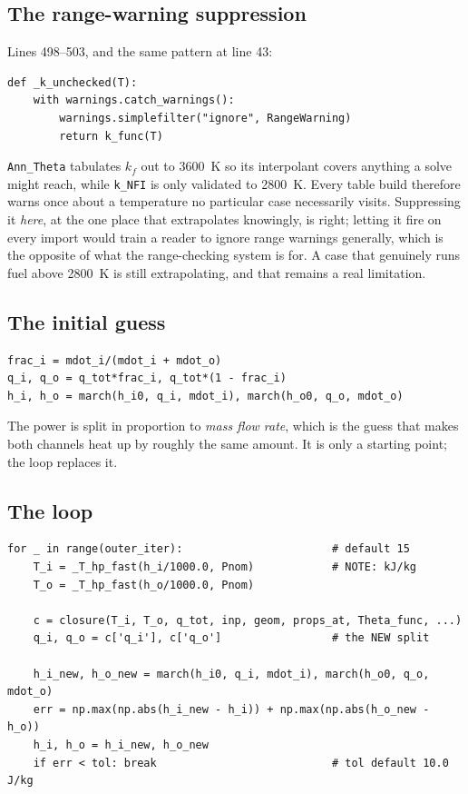 \documentclass[11pt]{article}
\newcommand{\code}[1]{\texttt{#1}}
\begin{document}
\subsection{The range-warning suppression}
Lines 498--503, and the same pattern at line 43:
\begin{lstlisting}
def _k_unchecked(T):
    with warnings.catch_warnings():
        warnings.simplefilter("ignore", RangeWarning)
        return k_func(T)
\end{lstlisting}
\code{Ann\_Theta} tabulates $k_f$ out to 3600~K so its interpolant covers anything a
solve might reach, while \code{k\_NFI} is only validated to 2800~K. Every table build
therefore warns once about a temperature no particular case necessarily visits.
Suppressing it \emph{here}, at the one place that extrapolates knowingly, is right;
letting it fire on every import would train a reader to ignore range warnings generally,
which is the opposite of what the range-checking system is for. A case that genuinely
runs fuel above 2800~K is still extrapolating, and that remains a real limitation.

\subsection{The initial guess}
\begin{lstlisting}
frac_i = mdot_i/(mdot_i + mdot_o)
q_i, q_o = q_tot*frac_i, q_tot*(1 - frac_i)
h_i, h_o = march(h_i0, q_i, mdot_i), march(h_o0, q_o, mdot_o)
\end{lstlisting}
The power is split in proportion to \emph{mass flow rate}, which is the guess that makes
both channels heat up by roughly the same amount. It is only a starting point; the loop
replaces it.

\subsection{The loop}
\begin{lstlisting}
for _ in range(outer_iter):                       # default 15
    T_i = _T_hp_fast(h_i/1000.0, Pnom)            # NOTE: kJ/kg
    T_o = _T_hp_fast(h_o/1000.0, Pnom)

    c = closure(T_i, T_o, q_tot, inp, geom, props_at, Theta_func, ...)
    q_i, q_o = c['q_i'], c['q_o']                 # the NEW split

    h_i_new, h_o_new = march(h_i0, q_i, mdot_i), march(h_o0, q_o, mdot_o)
    err = np.max(np.abs(h_i_new - h_i)) + np.max(np.abs(h_o_new - h_o))
    h_i, h_o = h_i_new, h_o_new
    if err < tol: break                           # tol default 10.0 J/kg
\end{lstlisting}
\end{document}
